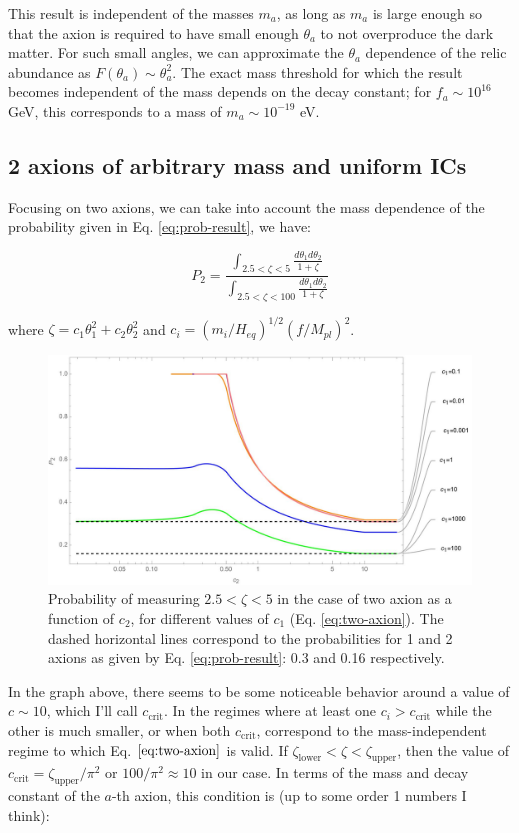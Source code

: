 \documentclass{article}
\begin{document}
This result is independent of the masses $m_a$, as long as $m_a$ is large enough so that the axion is required to have small enough $\theta_a$ to not overproduce the dark matter. For such small angles, we can approximate the $\theta_a$ dependence of the relic abundance as $F(\theta_a)\sim \theta_a^2$. The exact mass threshold for which the result becomes independent of the mass depends on the decay constant; for $f_a \sim 10^{16}$ GeV, this corresponds to a mass of $m_a \sim  10^{-19}$ eV.

\subsection{2 axions of arbitrary mass and uniform ICs}
Focusing on two axions, we can take into account the mass dependence of the probability given in Eq. \eqref{eq:prob-result}, we have:

\begin{equation}
\label{eq:two-axion}
P_2 = \frac{\int_{2.5<\zeta<5} \frac{d\theta_1d\theta_2}{1+\zeta}}{\int_{2.5<\zeta<100} \frac{d\theta_1d\theta_2}{1+\zeta}}
\end{equation}

\noindent where $\zeta = c_1\theta_1^2+c_2\theta_2^2$ and $c_i = (m_i/H_{eq})^{1/2}(f/M_{pl})^2$.

\begin{figure}[h]
    \includegraphics[scale=0.5]{figs/twoAxions.jpeg}
    \centering
    \caption{Probability of measuring $2.5<\zeta<5$ in the case of two axion as a function of $c_2$, for different values of $c_1$ (Eq. \eqref{eq:two-axion}). The dashed horizontal lines correspond to the probabilities for 1 and 2 axions as given by Eq. \eqref{eq:prob-result}: 0.3 and 0.16 respectively.}
\end{figure}

In the graph above, there seems to be some noticeable behavior around a value of $c\sim 10$, which I'll call $c_\text{crit}$. In the regimes where at least one $c_i > c_\text{crit}$ while the other is much smaller, or when both $c_\text{crit}$, correspond to the mass-independent regime to which Eq. $\eqref{eq:two-axion}$ is valid. If $\zeta_\text{lower}<\zeta<\zeta_\text{upper}$, then the value of $c_\text{crit} = \zeta_\text{upper}/\pi^2$ or $100/\pi^2\approx10$ in our case. In terms of the mass and decay constant of the $a$-th axion, this condition is (up to some order 1 numbers I think):
\end{document}
